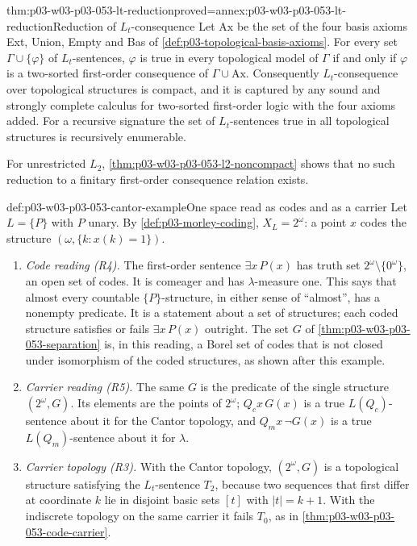 \begin{hbtheorem}{thm:p03-w03-p03-053-lt-reduction}{proved=annex:p03-w03-p03-053-lt-reduction}{Reduction of \(L_t\)-consequence}
Let \(\mathrm{Ax}\) be the set of the four basis axioms Ext, Union,
Empty and Bas of \cref{def:p03-topological-basis-axioms}. For
every set \(\Gamma\cup\{\varphi\}\) of \(L_t\)-sentences,
\(\varphi\) is true in every topological model of \(\Gamma\) if and only
if \(\varphi\) is a two-sorted first-order consequence of
\(\Gamma\cup\mathrm{Ax}\). Consequently \(L_t\)-consequence over
topological structures is compact, and it is captured by any sound and
strongly complete calculus for two-sorted first-order logic with the
four axioms added. For a recursive signature the set of \(L_t\)-sentences
true in all topological structures is recursively enumerable.
\end{hbtheorem}

For unrestricted \(L_2\), \cref{thm:p03-w03-p03-053-l2-noncompact} shows
that no such reduction to a finitary first-order consequence relation
exists.

\begin{hbexample}{def:p03-w03-p03-053-cantor-example}{One space read as codes and as a carrier}
Let \(L=\{P\}\) with \(P\) unary. By \cref{def:p03-morley-coding},
\(X_L=2^\omega\): a point \(x\) codes the structure
\((\omega,\{k:x(k)=1\})\).
\begin{enumerate}
\item \emph{Code reading (R4).} The first-order sentence
  \(\exists x\,P(x)\) has truth set \(2^\omega\setminus\{0^\omega\}\),
  an open set of codes. It is comeager and has \(\lambda\)-measure one.
  This says that almost every countable \(\{P\}\)-structure, in either
  sense of ``almost'', has a nonempty predicate. It is a statement about
  a set of structures; each coded structure satisfies or fails
  \(\exists x\,P(x)\) outright. The set \(G\) of
  \cref{thm:p03-w03-p03-053-separation} is, in this reading, a Borel set
  of codes that is not closed under isomorphism of the coded structures,
  as shown after this example.
\item \emph{Carrier reading (R5).} The same \(G\) is the predicate of
  the single structure \((2^\omega,G)\). Its elements are the points of
  \(2^\omega\); \(Q_cx\,G(x)\) is a true \(L(Q_c)\)-sentence about it
  for the Cantor topology, and \(Q_mx\,\neg G(x)\) is a true
  \(L(Q_m)\)-sentence about it for \(\lambda\).
\item \emph{Carrier topology (R3).} With the Cantor topology,
  \((2^\omega,G)\) is a topological structure satisfying the
  \(L_t\)-sentence \(T_2\), because two sequences that first differ at
  coordinate \(k\) lie in disjoint basic sets \([t]\) with \(|t|=k+1\).
  With the indiscrete topology on the same carrier it fails \(T_0\), as
  in \cref{thm:p03-w03-p03-053-code-carrier}.
\end{enumerate}
\end{hbexample}


